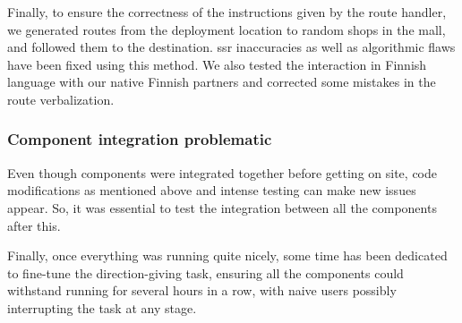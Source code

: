 \documentclass[a4paper,11pt,twoside]{StyleThese}
\begin{document}
Finally, to ensure the correctness of the instructions given by the route handler, we generated routes from the deployment location to random shops in the mall, and followed them to the destination. \acrshort{ssr} inaccuracies as well as algorithmic flaws have been fixed using this method. We also tested the interaction in Finnish language with our native Finnish partners and corrected some mistakes in the route verbalization.


\subsubsection{Component integration problematic}
Even though components were integrated together before getting on site, code modifications as mentioned above and intense testing can make new issues appear. So, it was essential to test the integration between all the components after this.

Finally, once everything was running quite nicely, some time has been dedicated to fine-tune the direction-giving task, ensuring all the components could withstand running for several hours in a row, with naive users possibly interrupting the task at any stage. 
\end{document}
